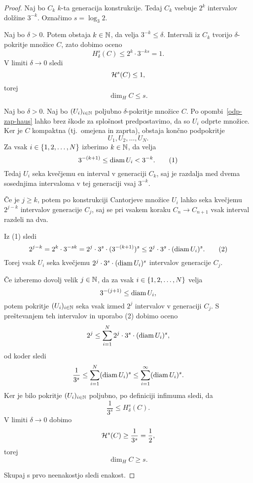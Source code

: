 \begin{proof}    
    Naj bo \(C_k\) \(k\)-ta generacija konstrukcije. Tedaj \(C_k\) vsebuje \(2^k\) intervalov dolžine \(3^{-k}\). Označimo \(s = \log_3 2\).

    Naj bo \(\delta > 0\). Potem obstaja \(k \in \mathbb{N}\), da velja \(3^{-k} \leq \delta\). Intervali iz \(C_k\) tvorijo \(\delta\)-pokritje množice \(C\), zato dobimo oceno
    \[H^s_\delta(C) \leq 2^k \cdot 3^{-ks} = 1.\]
    V limiti \(\delta \to 0\) sledi
    \[\mathcal{H}^s(C) \leq 1,\]
    torej 
    \[\dim_H C \leq s.\]

    Naj bo \(\delta > 0\). Naj bo \((U_i)_{i \in \mathbb{N}}\) poljubno \(\delta\)-pokritje množice \(C\). Po opombi~\ref{odp-zap-haus} lahko brez škode za splošnost predpostavimo, da so \(U_i\) odprte množice. Ker je \(C\) kompaktna (tj.\ omejena in zaprta), obstaja končno podpokritje 
    \[U_1, U_2, \ldots, U_N.\]
    Za vsak \(i \in \left\{1, 2, \ldots, N\right\}\) izberimo \(k \in \mathbb{N}\), da velja
    \[3^{-(k + 1)} \leq \operatorname{diam} U_i < 3^{-k}. \tag{1}\]
    Tedaj \(U_i\) seka kvečjemu en interval v generaciji \(C_k\), saj je razdalja med dvema sosednjima intervaloma v tej generaciji vsaj \(3^{-k}\).

    Če je \(j \geq k\), potem po konstrukciji Cantorjeve množice \(U_i\) lahko seka kvečjemu \(2^{j - k}\) intervalov generacije \(C_j\), saj se pri vsakem koraku \(C_n \to C_{n+1}\) vsak interval razdeli na dva.

    Iz (1) sledi
    \[2^{j - k} = 2^k \cdot 3^{-sk} = 2^j \cdot 3^s \cdot (3^{-(k+1)})^s \leq 2^j \cdot 3^s \cdot (\operatorname{diam} U_i)^s. \tag{2}\]
    Torej vsak \(U_i\) seka kvečjemu \(2^j \cdot 3^s \cdot (\operatorname{diam} U_i)^s\) intervalov generacije \(C_j\).

    Če izberemo dovolj velik \(j \in \mathbb{N}\), da za vsak \(i \in \left\{1, 2, \ldots, N\right\}\) velja
    \[3^{-(j+1)} \leq \operatorname{diam} U_i,\]
    potem pokritje \((U_i)_{i \in \mathbb{N}}\) seka vsak izmed \(2^j\) intervalov v generaciji \(C_j\). S preštevanjem teh intervalov in uporabo (2) dobimo oceno
    \[2^j \leq \sum_{i=1}^{N} 2^j \cdot 3^s \cdot (\operatorname{diam} U_i)^s,\]
    od koder sledi
    \[\frac{1}{3^s} \leq \sum_{i=1}^{N} (\operatorname{diam} U_i)^s \leq \sum_{i=1}^{\infty} (\operatorname{diam} U_i)^s.\]
    Ker je bilo pokritje \((U_i)_{i \in \mathbb{N}}\) poljubno, po definiciji infimuma sledi, da 
    \[\frac{1}{3^s} \leq H^s_\delta(C).\]
    V limiti \(\delta \to 0\) dobimo
    \[\mathcal{H}^s(C) \geq \frac{1}{3^s} = \frac{1}{2},\]
    torej 
    \[\dim_H C \geq s.\]

    Skupaj s prvo neenakostjo sledi enakost.
\end{proof}

